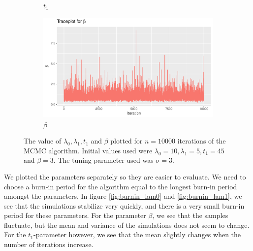 \begin{figure}[h]
\begin{subfigure}[b]{0.49\textwidth}
        \caption{$t_1$}
        \label{fig:burnin_t}
    \end{subfigure}
    \begin{subfigure}[b]{0.49\textwidth}
        \centering
        \includegraphics[width = \textwidth]{Images/sim_beta.pdf}
        \caption{$\beta$}
        \label{fig:burnin_beta}
    \end{subfigure}
    \caption{The value of $\lambda_0, \lambda_1, t_1$ and $\beta$ plotted for $n = 10000$ iterations of the MCMC algorithm. Initial values used were $\lambda_0 = 10, \lambda_1 = 5, t_1 = 45$ and $\beta = 3$. The tuning parameter used was $\sigma = 3$.}
    \label{fig:burnin_singleMH}
\end{figure}

We plotted the parameters separately so they are easier to evaluate. We need to choose a burn-in period for the algorithm equal to the longest burn-in period amongst the parameters. 
In figure \ref{fig:burnin_lam0} and \ref{fig:burnin_lam1}, we see that the simulations stabilize very quickly, and there is a very small burn-in period for these parameters. 
For the parameter $\beta$, we see that the samples fluctuate, but the mean and variance of the simulations does not seem to change. For the $t_1$-parameter however, we see that the mean slightly changes when the number of iterations increase. 



